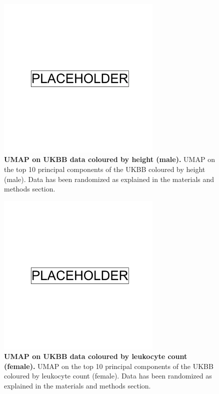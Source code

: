 \newpage

\begin{figure}
    \centering
    \includegraphics[width=0.7\textwidth]{placeholder.png}
    \caption[UMAP on UKBB data coloured by height (male)]{\textbf{UMAP on UKBB data coloured by height (male).} UMAP on the top 10 principal components of the UKBB coloured by height (male). Data has been randomized as explained in the materials and methods section.}
    \label{fig:supp_ukbb_height_m}
\end{figure}

\newpage

\begin{figure}
    \centering
    \includegraphics[width=0.7\textwidth]{placeholder.png}
    \caption[UMAP on UKBB data coloured by leukocyte count (female)]{\textbf{UMAP on UKBB data coloured by leukocyte count (female).} UMAP on the top 10 principal components of the UKBB coloured by leukocyte count (female). Data has been randomized as explained in the materials and methods section.}
    \label{fig:supp_ukbb_leukocyte_f}
\end{figure}

